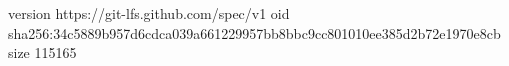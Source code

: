 version https://git-lfs.github.com/spec/v1
oid sha256:34c5889b957d6cdca039a661229957bb8bbc9cc801010ee385d2b72e1970e8cb
size 115165

